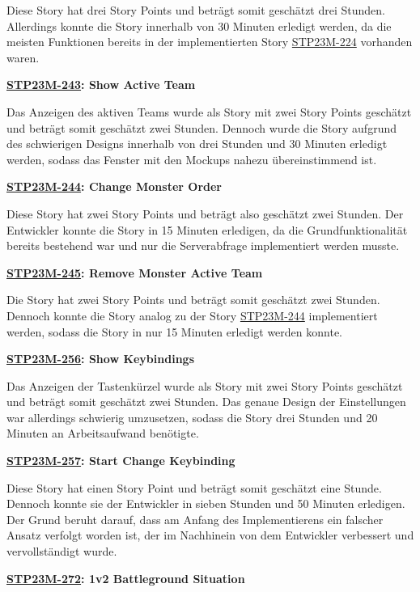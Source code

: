 Diese Story hat drei Story Points und beträgt somit geschätzt drei Stunden. Allerdings konnte die Story innerhalb von 30 Minuten erledigt werden, da die meisten Funktionen bereits in der implementierten Story \hyperlink{T224}{\hypertarget{S224}{STP23M-224}} vorhanden waren.

\textbf{\hyperlink{T243}{\hypertarget{S243}{STP23M-243}}: Show Active Team}

Das Anzeigen des aktiven Teams wurde als Story mit zwei Story Points geschätzt und beträgt somit geschätzt zwei Stunden. Dennoch wurde die Story aufgrund des schwierigen Designs innerhalb von drei Stunden und 30 Minuten erledigt werden, sodass das Fenster mit den Mockups nahezu übereinstimmend ist. 

\textbf{\hyperlink{T244}{\hypertarget{S244}{STP23M-244}}: Change Monster Order}

Diese Story hat zwei Story Points und beträgt also geschätzt zwei Stunden. Der Entwickler konnte die Story in 15 Minuten erledigen, da die Grundfunktionalität bereits bestehend war und nur die Serverabfrage implementiert werden musste.

\textbf{\hyperlink{T245}{\hypertarget{S245}{STP23M-245}}: Remove Monster Active Team}

Die Story hat zwei Story Points und beträgt somit geschätzt zwei Stunden. Dennoch konnte die Story analog zu der Story \hyperlink{T244}{\hypertarget{S244}{STP23M-244}} implementiert werden, sodass die Story in nur 15 Minuten erledigt werden konnte. 

\textbf{\hyperlink{T256}{\hypertarget{S256}{STP23M-256}}: Show Keybindings}

Das Anzeigen der Tastenkürzel wurde als Story mit zwei Story Points geschätzt und beträgt somit geschätzt zwei Stunden. Das genaue Design der Einstellungen war allerdings schwierig umzusetzen, sodass die Story drei Stunden und 20 Minuten an Arbeitsaufwand benötigte.

\textbf{\hyperlink{T257}{\hypertarget{S257}{STP23M-257}}: Start Change Keybinding}

Diese Story hat einen Story Point und beträgt somit geschätzt eine Stunde. Dennoch konnte sie der Entwickler in sieben Stunden und 50 Minuten erledigen. Der Grund beruht darauf, dass am Anfang des Implementierens ein falscher Ansatz verfolgt worden ist, der im Nachhinein von dem Entwickler verbessert und vervollständigt wurde. 

\textbf{\hyperlink{T272}{\hypertarget{S272}{STP23M-272}}: 1v2 Battleground Situation}

